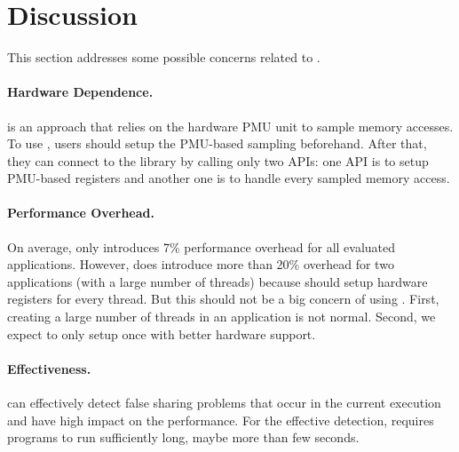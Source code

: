 \section{Discussion}

\label{sec:discuss}

This section addresses some possible concerns related to \Cheetah{}. 

\paragraph{Hardware Dependence.} \cheetah{} is an approach that relies on the hardware PMU unit to sample memory accesses. To use \cheetah{}, users should setup the PMU-based sampling beforehand. After that, they can connect to the \cheetah{} library by calling only two APIs: one API is to setup PMU-based registers and another one is to handle every sampled memory access. 

\paragraph{Performance Overhead.} On average, \Cheetah{} only introduces 7\% performance overhead for all evaluated applications. However, \cheetah{} does introduce more than 20\% overhead for two applications (with a large number of threads) because \cheetah{} should setup hardware registers for every thread. But this should not be a big concern of using \cheetah{}. First, creating a large number of threads in an application is not normal. Second, we expect to only setup once with better hardware support. 

\paragraph{Effectiveness.} \Cheetah{} can effectively detect false sharing problems that occur in the current execution and have high impact on the performance. For the effective detection, \Cheetah{} requires programs to run sufficiently long, maybe more than few seconds. 

